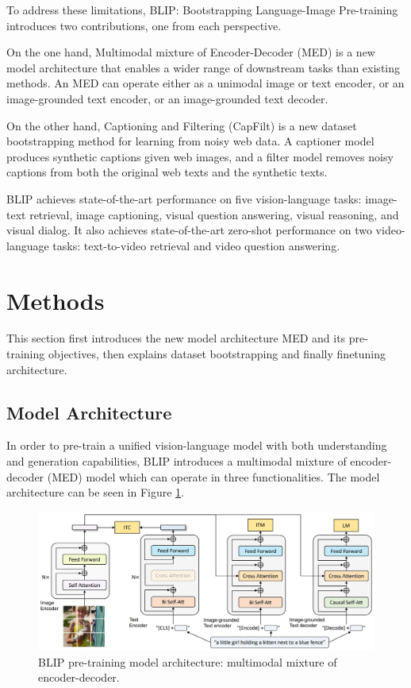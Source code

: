 \documentclass[11pt]{article}
\begin{document}
To address these limitations, BLIP: Bootstrapping Language-Image Pre-training \cite{li2022blip} introduces two contributions, one from each perspective.

On the one hand, Multimodal mixture of Encoder-Decoder (MED) is a new model architecture that enables a wider range of downstream tasks than existing methods. An MED can operate either as a unimodal image or text encoder, or an image-grounded text encoder, or an image-grounded text decoder.

On the other hand, Captioning and Filtering (CapFilt) is a new dataset bootstrapping method for learning from noisy web data. A captioner model produces synthetic captions given web images, and a filter model removes noisy captions from both the original web texts and the synthetic texts.

BLIP achieves state-of-the-art performance on five vision-language tasks:  image-text retrieval, image captioning, visual question answering, visual reasoning, and visual dialog. It also achieves state-of-the-art zero-shot performance on two video-language tasks: text-to-video retrieval and video question answering.

\section{Methods}

This section first introduces the new model architecture MED and its pre-training objectives, then explains dataset bootstrapping and finally finetuning architecture.

\subsection{Model Architecture}

In order to pre-train a unified vision-language model with both understanding and generation capabilities, BLIP introduces a multimodal mixture of encoder-decoder (MED) model which can operate in three functionalities. The model architecture can be seen in Figure \ref{fig:blip_pretraining}.

\begin{figure}
    \centering
    \includegraphics[width=\linewidth]{blip_pretraining.png}
    \caption{BLIP pre-training model architecture: multimodal mixture
of encoder-decoder.}
    \label{fig:blip_pretraining}
\end{figure}
\end{document}
